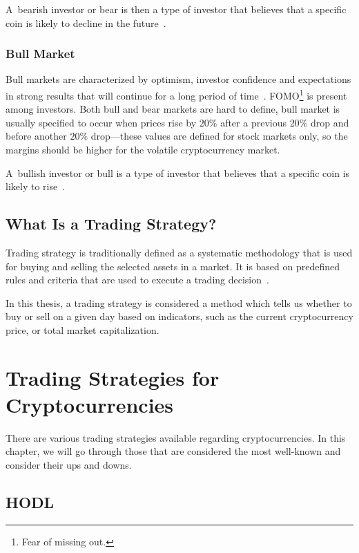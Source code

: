 A~bearish investor or bear is then a type of investor that believes that a specific coin is likely to decline in the future~\cite{investopedia-bull}.

\subsection*{Bull Market}
Bull markets are characterized by optimism, investor confidence and expectations in strong results that will continue for a long period of time~\cite{investopedia-bull-market}. FOMO\footnote{Fear of missing out.} is present among investors. Both bull and bear markets are hard to define, bull market is usually specified to occur when prices rise by $20\%$ after a previous $20\%$ drop and before another $20\%$ drop---these values are defined for stock markets only, so the margins should be higher for the volatile cryptocurrency market.

A~bullish investor or bull is a type of investor that believes that a specific coin is likely to rise~\cite{investopedia-bull}.

\section{What Is a Trading Strategy?}
Trading strategy is traditionally defined as a systematic methodology that is used for buying and selling the selected assets in a market. It is based on predefined rules and criteria that are used to execute a trading decision~\cite{investopedia:trading-strategy}.

In this thesis, a trading strategy is considered a method which tells us whether to buy or sell on a given day based on indicators, such as the current cryptocurrency price, or total market capitalization.

\chapter{Trading Strategies for Cryptocurrencies}
\label{chapter-trading-stategies}

There are various trading strategies available regarding cryptocurrencies.
In this chapter, we will go through those that are considered the most well-known and consider
their ups and downs.

\section{HODL}


